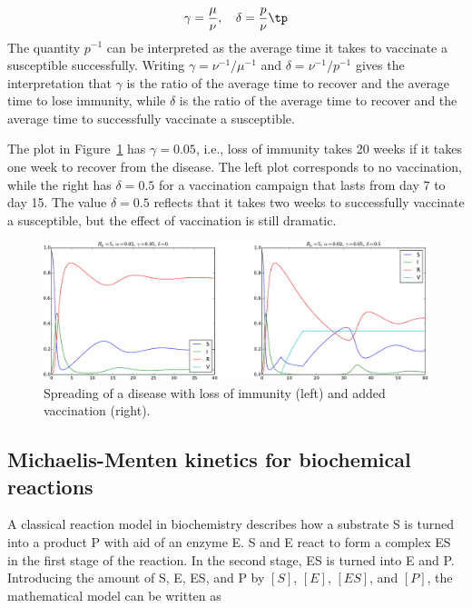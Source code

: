 \documentclass[graybox,envcountchap,sectrefs,final]{svmonodo}
\begin{document}
\[ \gamma = \frac{\mu}{\nu},\quad \delta = \frac{p}{\nu}\tp \]
The quantity $p^{-1}$ can be interpreted as the average time it takes
to vaccinate a susceptible successfully. Writing $\gamma = \nu^{-1}/\mu^{-1}$
and $\delta = \nu^{-1}/p^{-1}$ gives the interpretation that $\gamma$
is the ratio of the average time to recover and the average time to
lose immunity, while $\delta$ is the ratio of the average time to recover
and the average time to successfully vaccinate a susceptible.

The plot in Figure~\ref{sec:scale:SIRV:fig} has $\gamma = 0.05$, i.e.,
loss of immunity takes 20 weeks if it takes one week to recover from
the disease. The left plot corresponds to no vaccination, while the
right has $\delta = 0.5$ for a vaccination campaign that lasts from
day 7 to day 15. The value $\delta =0.5$ reflects that
it takes two weeks to successfully
vaccinate a susceptible, but the effect of vaccination is still dramatic.


\begin{figure}[!ht]  %
  \centerline{\includegraphics[width=1.0\linewidth]{fig-scaling/SIRV2.pdf}}
  \caption{
  Spreading of a disease with loss of immunity (left) and added vaccination (right). \label{sec:scale:SIRV:fig}
  }
\end{figure}



\subsection{Michaelis-Menten kinetics for biochemical reactions}
\label{scale:MMK}

A classical reaction model in biochemistry describes how a
substrate S is turned into a product P with aid of an enzyme E.
S and E react to form a complex ES in the first stage of the reaction.
In the second stage, ES is turned into E and P.
Introducing the amount of S, E, ES, and P by $[S]$, $[E]$, $[ES]$, and
$[P]$, the mathematical model can be written as
\end{document}
